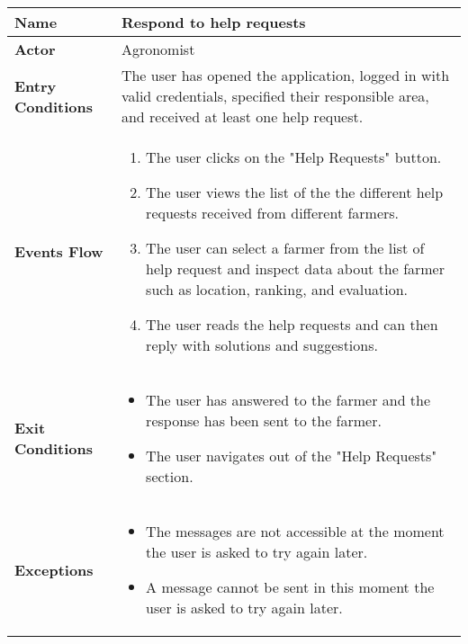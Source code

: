 
\begin{center}
\renewcommand{\arraystretch}{1.25}
\begin{tabular}{|l|>{\raggedright\arraybackslash}m{12cm}|}

    \hline
    \textbf{Name} & Respond to help requests\\
    \hline
   	\textbf{Actor} & Agronomist\\
    \hline
    \textbf{Entry Conditions} & The user has opened the application, logged in with valid credentials, specified their responsible area, and received at least one help request.\\
    \hline
    \textbf{Events Flow} & \begin{enumerate}
            \item The user clicks on the "Help Requests" button.
            \item The user views the list of the the different help requests received from different farmers.
            \item The user can select a farmer from the list of help request and inspect data about the farmer such as location, ranking, and evaluation.
            \item The user reads the help requests and can then reply with solutions and suggestions.
       \end{enumerate}\\
    \hline
    \textbf{Exit Conditions} & \begin{itemize}
    	\item The user has answered to the farmer and the response has been sent to the farmer.
    	\item The user navigates out of the "Help Requests" section.
    \end{itemize}\\
    \hline
    \textbf{Exceptions} & 
       \begin{itemize}
          \item The messages are not accessible at the moment the user is asked to try again later.
          \item A message cannot be sent in this moment the user is asked to try again later.
        \end{itemize}
     \\
    \hline
\end{tabular}
\end{center}